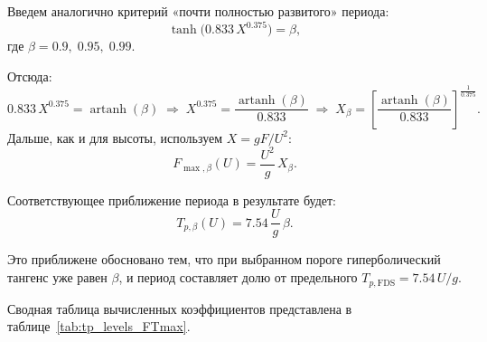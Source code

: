 Введем аналогично критерий «почти полностью развитого» периода:
\begin{equation}
    \tanh\!\bigl(0.833\,X^{0.375}\bigr) = \beta,
\end{equation}
где $\beta = 0.9,\;0.95,\;0.99$.

Отсюда:
\begin{equation}
    0.833\,X^{0.375} = \operatorname{artanh}(\beta)
    \;\Rightarrow\;
    X^{0.375} = \frac{\operatorname{artanh}(\beta)}{0.833}
    \;\Rightarrow\;
    X_\beta = \left[\frac{\operatorname{artanh}(\beta)}{0.833}\right]^{\frac{1}{0.375}}.
\end{equation}
Дальше, как и для высоты, используем $X = gF/U^2$:
\begin{equation}
    F_{\max,\beta}(U) = \frac{U^2}{g}\,X_\beta.
\end{equation}

Соответствующее приближение периода в результате будет:
\begin{equation}
    T_{p,\beta}(U) = 7.54\,\frac{U}{g}\,\beta.
\end{equation}

Это приближене обосновано тем, что при выбранном пороге гиперболический тангенс уже равен $\beta$, и период составляет долю от предельного $T_{p,\mathrm{FDS}} = 7.54\,U/g$.

Сводная таблица вычисленных коэффициентов представлена в таблице~\ref{tab:tp_levels_FTmax}.

